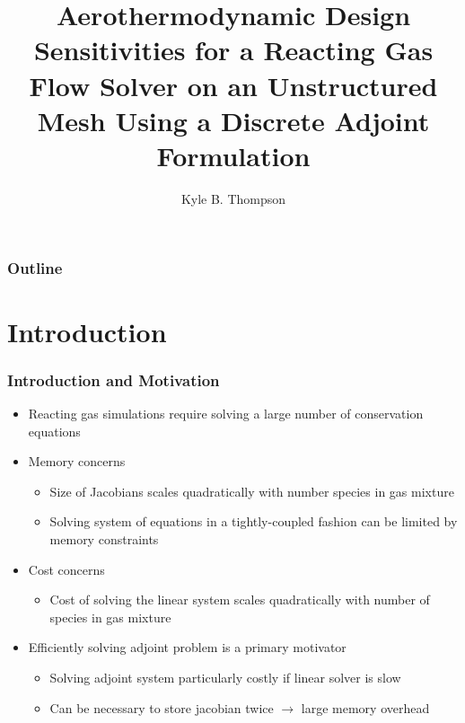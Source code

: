 \documentclass{beamer}
\title{Aerothermodynamic Design Sensitivities for a Reacting Gas Flow Solver
  on an Unstructured Mesh Using a Discrete Adjoint Formulation}
\author{ Kyle B. Thompson }
\begin{document}
\begin{frame}
  \titlepage
\end{frame}
\begin{frame}
  \frametitle{Outline}
  \tableofcontents
\end{frame}
\section{Introduction}
\begin{frame}
  \frametitle{Introduction and Motivation}
  \begin{itemize}
    \item Reacting gas simulations require solving a large number of conservation
      equations
    \item Memory concerns
    \begin{itemize}
        \item Size of Jacobians scales quadratically with number species in gas mixture
        \item Solving system of equations in a tightly-coupled fashion can be
          limited by memory constraints
    \end{itemize}
    \item Cost concerns
    \begin{itemize}
      \item Cost of solving the linear system scales quadratically with number
      of species in gas mixture
    \end{itemize}
    \item Efficiently solving adjoint problem is a primary motivator
      \begin{itemize}
        \item Solving adjoint system particularly costly if linear solver is
          slow
        \item Can be necessary to store jacobian twice $\to$ large memory
          overhead
      \end{itemize}
  \end{itemize}
\end{frame}
\end{document}
